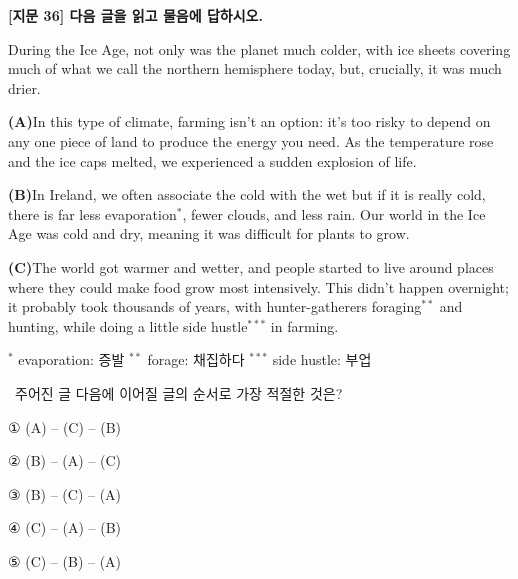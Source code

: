 \documentclass[11pt,a4paper]{article}
\newcommand{\qno}[1]{\par\vspace{8pt}\noindent{\sffamily\bfseries #1.}\ }
\newcommand{\instr}[1]{{\sffamily #1}\par\vspace{3pt}}
\begin{document}
\begin{center}
{\fontsize{15}{17}\selectfont\sffamily\bfseries [지문 36] 다음 글을 읽고 물음에 답하시오.}
\end{center}
\vspace{4pt}

\begin{pbox}
During the Ice Age, not only was the planet much colder, with ice sheets covering much of what we call the northern hemisphere today, but, crucially, it was much drier.
\end{pbox}

\vspace{6pt}

\noindent\textbf{(A)}\quad In this type of climate, farming isn't an option: it's too risky to depend on any one piece of land to produce the energy you need. As the temperature rose and the ice caps melted, we experienced a sudden explosion of life.

\vspace{6pt}

\noindent\textbf{(B)}\quad In Ireland, we often associate the cold with the wet but if it is really cold, there is far less evaporation$^{*}$, fewer clouds, and less rain. Our world in the Ice Age was cold and dry, meaning it was difficult for plants to grow.

\vspace{6pt}

\noindent\textbf{(C)}\quad The world got warmer and wetter, and people started to live around places where they could make food grow most intensively. This didn't happen overnight; it probably took thousands of years, with hunter-gatherers foraging$^{**}$ and hunting, while doing a little side hustle$^{***}$ in farming.

\vspace{4pt}
\noindent\footnotesize{$^{*}$ evaporation: 증발 \quad $^{**}$ forage: 채집하다 \quad $^{***}$ side hustle: 부업}
\normalsize

\bigskip

\qno{1}\instr{주어진 글 다음에 이어질 글의 순서로 가장 적절한 것은?}
\begin{choices}
\item ① (A) -- (C) -- (B)
\item ② (B) -- (A) -- (C)
\item ③ (B) -- (C) -- (A)
\item ④ (C) -- (A) -- (B)
\item ⑤ (C) -- (B) -- (A)
\end{choices}
\end{document}
